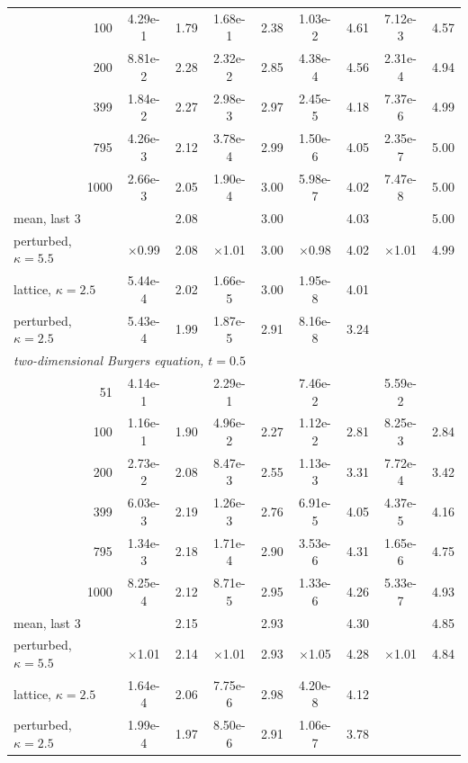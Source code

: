\documentclass[11pt,a4paper]{article}
\numberwithin{equation}{section}
\begin{document}
\begin{table}[!htbp]
\begin{tabular}{rcccccccc}
100 & 4.29e-1 & 1.79 & 1.68e-1 & 2.38 & 1.03e-2 & 4.61 & 7.12e-3 & 4.57\\
200 & 8.81e-2 & 2.28 & 2.32e-2 & 2.85 & 4.38e-4 & 4.56 & 2.31e-4 & 4.94\\
399 & 1.84e-2 & 2.27 & 2.98e-3 & 2.97 & 2.45e-5 & 4.18 & 7.37e-6 & 4.99\\
795 & 4.26e-3 & 2.12 & 3.78e-4 & 2.99 & 1.50e-6 & 4.05 & 2.35e-7 & 5.00\\
1000 & 2.66e-3 & 2.05 & 1.90e-4 & 3.00 & 5.98e-7 & 4.02 & 7.47e-8 & 5.00\\
\multicolumn{1}{l}{mean, last 3} &  & 2.08 &  & 3.00 &  & 4.03 &  & 5.00\\
\multicolumn{1}{l}{perturbed, $\kappa=5.5$} & $\times$0.99 & 2.08 & $\times$1.01 & 3.00 & $\times$0.98 & 4.02 & $\times$1.01 & 4.99\\
\multicolumn{1}{l}{lattice, $\kappa=2.5$} & 5.44e-4 & 2.02 & 1.66e-5 & 3.00 & 1.95e-8 & 4.01 &  & \\
\multicolumn{1}{l}{perturbed, $\kappa=2.5$} & 5.43e-4 & 1.99 & 1.87e-5 & 2.91 & 8.16e-8 & 3.24 &  & \\
\midrule
\multicolumn{9}{l}{\emph{two-dimensional Burgers equation, $t=0.5$}}\\
51 & 4.14e-1 &  & 2.29e-1 &  & 7.46e-2 &  & 5.59e-2 & \\
100 & 1.16e-1 & 1.90 & 4.96e-2 & 2.27 & 1.12e-2 & 2.81 & 8.25e-3 & 2.84\\
200 & 2.73e-2 & 2.08 & 8.47e-3 & 2.55 & 1.13e-3 & 3.31 & 7.72e-4 & 3.42\\
399 & 6.03e-3 & 2.19 & 1.26e-3 & 2.76 & 6.91e-5 & 4.05 & 4.37e-5 & 4.16\\
795 & 1.34e-3 & 2.18 & 1.71e-4 & 2.90 & 3.53e-6 & 4.31 & 1.65e-6 & 4.75\\
1000 & 8.25e-4 & 2.12 & 8.71e-5 & 2.95 & 1.33e-6 & 4.26 & 5.33e-7 & 4.93\\
\multicolumn{1}{l}{mean, last 3} &  & 2.15 &  & 2.93 &  & 4.30 &  & 4.85\\
\multicolumn{1}{l}{perturbed, $\kappa=5.5$} & $\times$1.01 & 2.14 & $\times$1.01 & 2.93 & $\times$1.05 & 4.28 & $\times$1.01 & 4.84\\
\multicolumn{1}{l}{lattice, $\kappa=2.5$} & 1.64e-4 & 2.06 & 7.75e-6 & 2.98 & 4.20e-8 & 4.12 &  & \\
\multicolumn{1}{l}{perturbed, $\kappa=2.5$} & 1.99e-4 & 1.97 & 8.50e-6 & 2.91 & 1.06e-7 & 3.78 &  & \\
\bottomrule
\end{tabular}
\end{table}
\end{document}
